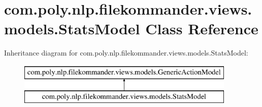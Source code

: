 \hypertarget{classcom_1_1poly_1_1nlp_1_1filekommander_1_1views_1_1models_1_1_stats_model}{\section{com.\-poly.\-nlp.\-filekommander.\-views.\-models.\-Stats\-Model Class Reference}
\label{classcom_1_1poly_1_1nlp_1_1filekommander_1_1views_1_1models_1_1_stats_model}
}
Inheritance diagram for com.\-poly.\-nlp.\-filekommander.\-views.\-models.\-Stats\-Model\-:\begin{figure}[H]
\begin{center}
\leavevmode
\includegraphics[height=2.000000cm]{classcom_1_1poly_1_1nlp_1_1filekommander_1_1views_1_1models_1_1_stats_model}
\end{center}
\end{figure}

